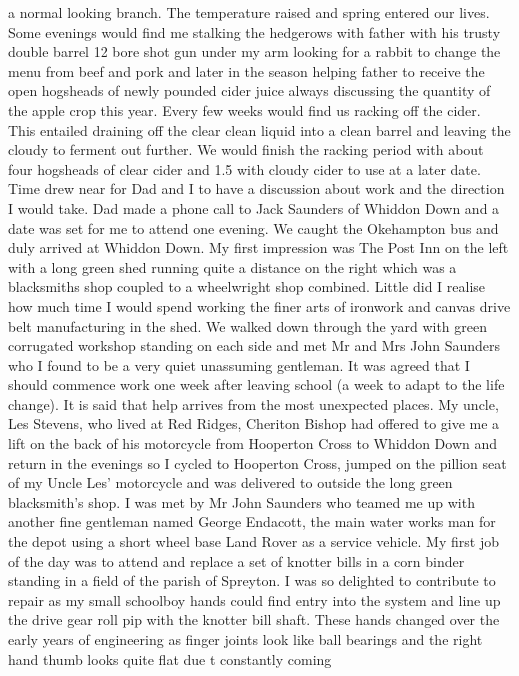 a normal looking branch.  The temperature raised and spring entered our lives.
Some evenings would find me stalking the hedgerows with father with his trusty
double barrel 12 bore shot gun under my arm looking for a rabbit to change the
menu from beef and pork and later in the season helping father to receive the
open hogsheads  of newly pounded cider juice always discussing the quantity of
the apple crop this year.  Every few weeks would find us racking off the cider.
This entailed draining off the clear clean liquid into a clean barrel and
leaving the cloudy to ferment out further.  We would finish the racking period
with about four hogsheads of clear cider and 1.5 with cloudy cider to use at a
later date. Time drew near for Dad and I to have a discussion about work and
the direction I would take.  Dad made a phone call to Jack Saunders of Whiddon
Down and a date was set for me to attend one evening.  We caught the Okehampton
bus and duly arrived at Whiddon Down.  My first impression was The Post Inn on
the left with a long green shed running quite a distance on the right which was
a blacksmiths shop coupled to a wheelwright shop combined.  Little did I
realise how much time I would spend working the finer arts of ironwork and
canvas drive belt manufacturing in the shed.  We walked down through the yard
with green corrugated workshop standing on each side and met Mr and Mrs John
Saunders who I found to be a very quiet unassuming gentleman.  It was agreed
that I should commence work one week after leaving school (a week to adapt to
the life change).  It is said that help arrives from the most unexpected
places.  My uncle, Les Stevens, who lived at Red Ridges, Cheriton Bishop had
offered to give me a lift on the back of his motorcycle from Hooperton Cross to
Whiddon Down and return in the evenings so I cycled to Hooperton Cross, jumped
on the pillion seat of my Uncle Les' motorcycle and was delivered to outside
the long green blacksmith's shop.  I was met by Mr John Saunders who teamed me
up with another fine gentleman named George Endacott, the main water works man
for the depot using a short wheel base Land Rover as a service vehicle.  My
first job of the day was to attend and replace a set of knotter bills in a corn
binder standing in a field of the parish of Spreyton.  I was so delighted to
contribute to repair as my small schoolboy hands could find entry into the
system and line up the drive gear roll pip with the knotter bill shaft.  These
hands changed over the early years of engineering as finger joints look like
ball bearings and the right hand thumb looks quite flat due t constantly coming
